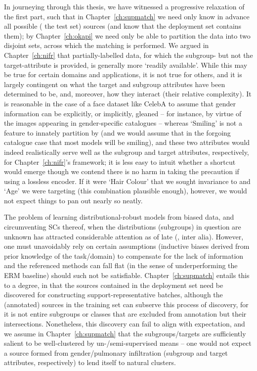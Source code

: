 %
In journeying through this thesis, we have witnessed a progressive relaxation of the first part,
such that in Chapter~\ref{ch:supmatch} we need only know in advance all possible (\wrt{} the test
set) sources (and know that the deployment set contains them); by Chapter~\ref{ch:okapi} we need
only be able to partition the data into two disjoint sets, across which the matching is performed.
%
We argued in Chapter~\ref{ch:nifr} that partially-labelled data, for which the subgroup- but not
the target-attribute is provided, is generally more `readily available'. 
%
While this may be true for certain domains and applications, it is not true for others, and it is
largely contingent on what the target and subgroup attributes have been determined to be, and,
moreover, how they interact (their relative complexity).
%
It is reasonable in the case of a face dataset like CelebA to assume that gender information can be
explicitly, or implicitly, gleaned -- for instance, by virtue of the images appearing in
gender-specific catalogues -- whereas `Smiling' is not a feature to innately partition by (and we
would assume that in the forgoing catalogue case that most models will be smiling), and these two
attributes would indeed realistically serve well as the subgroup and target attributes,
respectively, for Chapter~\ref{ch:nifr}'s framework; it is less easy to intuit whether a shortcut
would emerge though we contend there is no harm in taking the precaution if using a lossless
encoder.
%
If it were `Hair Colour' that we sought invariance to and `Age' we were targeting (this combination
plausible enough), however, we would not expect things to pan out nearly so neatly.

%
The problem of learning distributional-robust models from biased data, and circumventing \acp{SC}
thereof, when the distributions (subgroups) in question are unknown has attracted considerable
attention as of late (\cite{HasSriNamLia18, SohDunAngGuetal20, creager2021environment, liu2021just,
pezeshki2021gradient, taghanaki2022masktune, kim2022learning}, inter alia).
%
However, one must unavoidably rely on certain assumptions (inductive biases derived from prior
knowledge of the task/domain) to compensate for the lack of information and the referenced methods
can fall flat (in the sense of underperforming the ERM baseline) should such not be satisfiable.
%
Chapter~\ref{ch:supmatch} entails this to a degree, in that the sources contained in the deployment
set need be discovered for constructing support-representative batches, although the (annotated)
sources in the training set can subserve this process of discovery, for it is not entire subgroups
or classes that are excluded from annotation but their intersections.
%
Nonetheless, this discovery can fail to align with expectation, and we assume in
Chapter~\ref{ch:supmatch} that the subgroups/targets are sufficiently salient to be well-clustered
by un-/semi-supervised means -- one would not expect a source formed from gender/pulmonary
infiltration (subgroup and target attributes, respectively) to lend itself to natural clusters.

